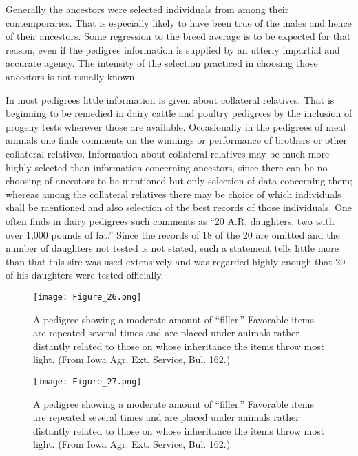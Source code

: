 Generally the ancestors were selected individuals from among their
contemporaries. That is especially likely to have been true of the males
and hence of their ancestors. Some regression to the breed average is to
be expected for that reason, even if the pedigree information is supplied
by an utterly impartial and accurate agency. The intensity of the
selection practiced in choosing those ancestors is not usually known.

In most pedigrees little information is given about collateral relatives.
That is beginning to be remedied in dairy cattle and poultry
pedigrees by the inclusion of progeny tests wherever those are available.
Occasionally in the pedigrees of meat animals one finds comments
on the winnings or performance of brothers or other collateral relatives.
Information about collateral relatives may be much more highly
selected than information concerning ancestors, since there can be no
choosing of ancestors to be mentioned but only selection of data
concerning them; whereas among the collateral relatives there may be
choice of which individuals shall be mentioned and also selection of
the best records of those individuals. One often finds in dairy pedigrees
such comments as ``20 A.R. daughters, two with over 1,000 pounds of
fat.'' Since the records of 18 of the 20 are omitted and the number of
daughters not tested is not stated, such a statement tells little more than
that this sire was used extensively and was regarded highly enough that
20 of his daughters were tested officially.

\begin{figure}
	\centering
    \texttt{[image: Figure\_26.png]}
    \caption{A pedigree showing a moderate amount of ``filler.'' Favorable
    		 items are repeated several times and are placed under animals
    		 rather distantly related to those on whose inheritance the
    		 items throw most light. (From Iowa Agr. Ext. Service, Bul. 162.)}
    \label{fig:Lush_Figure_26}
\end{figure}


\begin{figure}
	\centering
    \texttt{[image: Figure\_27.png]}
    \caption{A pedigree showing a moderate amount of ``filler.'' Favorable
    		 items are repeated several times and are placed under animals
    		 rather distantly related to those on whose inheritance the
    		 items throw most light. (From Iowa Agr. Ext. Service, Bul. 162.)}
    \label{fig:Lush_Figure_27}
\end{figure}

